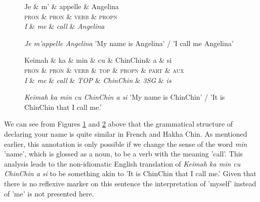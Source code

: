 \documentclass[10pt, a4paper]{article}
\begin{document}
\begin{figure}[h]
\centering
 \begin{dependency} 
   \begin{deptext}[column sep=0.4cm]
     Je \& m' \& appelle \& Angelina\\
     \textsc{pron} \& \textsc{pron} \& \textsc{verb} \& \textsc{propn}\\
     \emph{I} \& \emph{me} \& \emph{call} \& \emph{Angelina} \\ 
     \end{deptext}
 \end{dependency}
\caption{\label{fig:french}}\emph{Je m'appelle Angelina} 'My name is Angelina' / 'I call me Angelina'
\end{figure}

\begin{figure}[h]
\centering
 \begin{dependency} 
   \begin{deptext}[column sep=0.1cm]
     Keimah \& ka \& min \& cu \& ChinChin\& a \& si \\
     \textsc{pron} \& \textsc{pron} \& \textsc{verb} \& \textsc{top} \& \textsc{propn} \& \textsc{part} \& \textsc{aux}\\
     \emph{I} \& \emph{me} \& \emph{call} \& \emph{TOP} \& \emph{ChinChin} \& \emph{3SG} \& \emph{is} \\ 
     \end{deptext}
 \end{dependency}
\caption{\label{fig:name}}\emph{Keimah ka min cu ChinChin a si} 'My name is ChinChin' / 'It is ChinChin that I call me.'
\end{figure}

We can see from Figures \ref{fig:french} and \ref{fig:name} above that the grammatical structure of declaring your name is quite similar in French and Hakha Chin. As mentioned earlier, this annotation is only possible if we change the sense of the word \emph{min} 'name', which is glossed as a noun, to be a verb with the meaning 'call'. This analysis leads to the non-idiomatic English translation of \emph{Keimah ka min cu ChinChin a si} to be something akin to 'It is ChinChin that I call me.' Given that there is no reflexive marker on this sentence the interpretation of 'myself' instead of 'me' is not presented here. 
\end{document}

